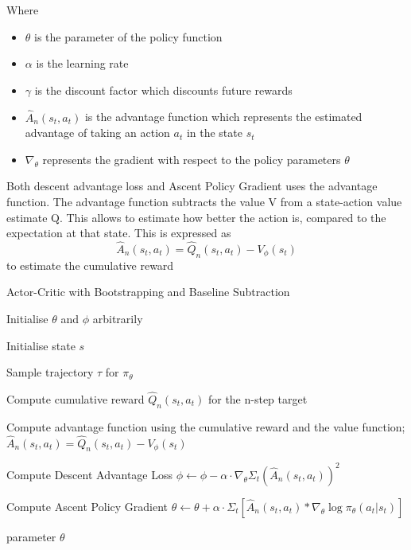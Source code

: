 \documentclass{article}
\begin{document}
Where 
\begin{itemize}[itemsep=0.0pt]
\renewcommand\labelitemi{.}
\item $\theta$ is the parameter of the policy function
\item $\alpha$ is the learning rate
\item $\gamma$ is the discount factor which discounts future rewards
\item $\hat{A}_n(s_t,a_t)$ is the advantage function which represents the estimated advantage of taking an action $a_t$ in the state $s_t$
\item $\nabla_\theta$ represents the gradient with respect to the policy parameters $\theta$
\end{itemize}
Both descent advantage loss and Ascent Policy Gradient uses the advantage function. The advantage function subtracts the value V from a state-action value estimate Q. This allows to estimate how better the action is, compared to the expectation at that state. This is expressed as 
\begin{equation*}
    \hat{A}_n(s_t,a_t) = \hat{Q}_n(s_t,a_t) - V_\phi(s_t)
\end{equation*}
to estimate the cumulative reward \(\)
\begin{algorithm}[htbp]
\caption{Actor-Critic with Bootstrapping and Baseline Subtraction}
\SetAlgoLined
\DontPrintSemicolon
\small %
Initialise $\theta$ and $\phi$ arbitrarily\;\\
{
    Initialise state $s$\;
     \item Sample trajectory $\tau$ for $\pi_\theta$
     \item
    {
     \item Compute cumulative reward $\hat{Q}_n(s_t,a_t)$  for the n-step target
     \item Compute advantage function using the cumulative reward and the value function;
     \(\hat{A}_n(s_t,a_t) = \hat{Q}_n(s_t,a_t) - V_\phi(s_t)\)
    }
    \item Compute Descent Advantage Loss
    \newline
     \(\phi \leftarrow \phi - \alpha \cdot \nabla_\theta\Sigma_t(\hat{A}_n(s_t,a_t))^2\) 
     \item Compute Ascent Policy Gradient
     \newline 
    \(\theta \leftarrow \theta + \alpha \cdot \Sigma_t[\hat{A}_n(s_t,a_t)*\nabla_\theta\log\pi_\theta(a_t|s_t)]\)
}
\State \Return parameter $\theta$
\end{algorithm}
\end{document}
